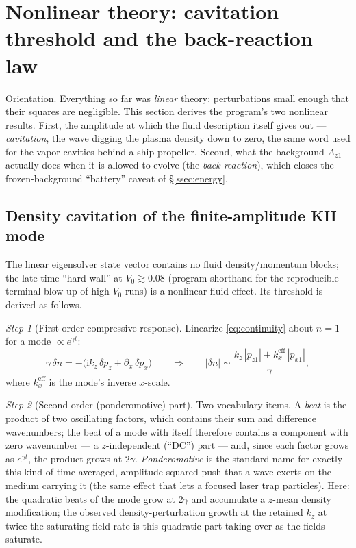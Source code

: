\documentclass[11pt,a4paper]{article}
\numberwithin{equation}{section}
\theoremstyle{remark}
\newtheorem{step}{Step}[subsection]
\newcommand{\Vo}{V_0}
\newcommand{\kz}{k_z}
\newcommand{\Az}{A_{z1}}
\newcommand{\ii}{\mathrm{i}}
\begin{document}
\section{Nonlinear theory: cavitation threshold and the back-reaction law}
\label{sec:nonlinear}

Orientation. Everything so far was \emph{linear} theory: perturbations
small enough that their squares are negligible. This section derives
the program's two nonlinear results. First, the amplitude at which the
fluid description itself gives out --- \emph{cavitation}, the wave
digging the plasma density down to zero, the same word used for the
vapor cavities behind a ship propeller. Second, what the background
$\Az$ actually does when it is allowed to evolve (the
\emph{back-reaction}), which closes the frozen-background ``battery''
caveat of \S\ref{ssec:energy}.

\subsection{Density cavitation of the finite-amplitude KH mode}
\label{ssec:cavitation}

The linear eigensolver state vector contains no fluid density/momentum
blocks; the late-time ``hard wall'' at $\Vo\gtrsim0.08$ (program
shorthand for the reproducible terminal blow-up of high-$\Vo$ runs) is
a nonlinear fluid effect. Its threshold is derived as follows.

\begin{step}[First-order compressive response]
Linearize \eqref{eq:continuity} about $n=1$ for a mode
$\propto e^{\gamma t}$:
\begin{equation}
\gamma\,\delta n=-\bigl(\ii\kz\,\delta p_z+\partial_x\,\delta p_x\bigr)
\qquad\Longrightarrow\qquad
|\delta n|\sim\frac{\kz\,|p_{z1}|+k_x^{\mathrm{eff}}\,|p_{x1}|}{\gamma},
\end{equation}
where $k_x^{\mathrm{eff}}$ is the mode's inverse $x$-scale.
\end{step}

\begin{step}[Second-order (ponderomotive) part]
Two vocabulary items. A \emph{beat} is the product of two oscillating
factors, which contains their sum and difference wavenumbers; the beat
of a mode with itself therefore contains a component with zero
wavenumber --- a $z$-independent (``DC'') part --- and, since each
factor grows as $e^{\gamma t}$, the product grows at $2\gamma$.
\emph{Ponderomotive} is the standard name for exactly this kind of
time-averaged, amplitude-squared push that a wave exerts on the medium
carrying it (the same effect that lets a focused laser trap particles).
Here: the quadratic beats of the mode grow at $2\gamma$ and accumulate
a $z$-mean density modification; the observed density-perturbation
growth at the retained $\kz$ at twice the saturating field rate is this
quadratic part taking over as the fields saturate.
\end{step}
\end{document}
